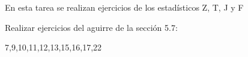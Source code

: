 \documentclass{oxmathproblems}
\begin{document}
En esta tarea se realizan ejercicios de los estadísticos Z, T, J y F

Realizar ejercicios del aguirre de la sección 5.7: 

7,9,10,11,12,13,15,16,17,22
\end{document}
